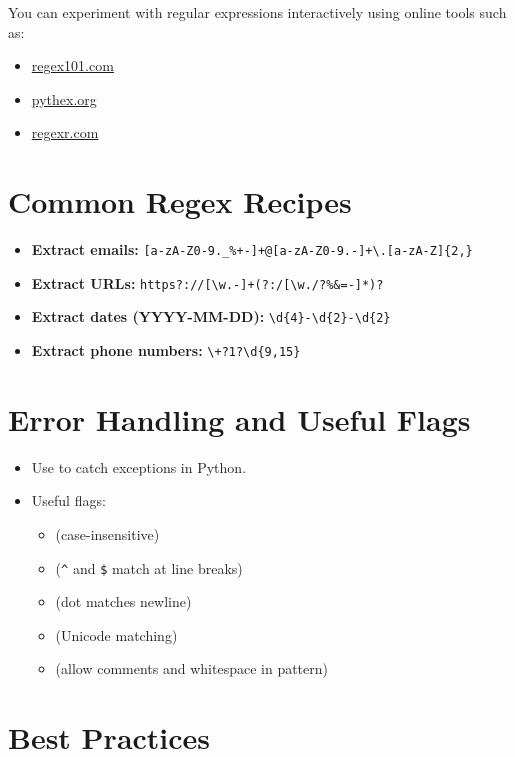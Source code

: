 You can experiment with regular expressions interactively using online tools such as:
\begin{itemize}
    \item \href{https://regex101.com/}{regex101.com}
    \item \href{https://pythex.org/}{pythex.org}
    \item \href{https://regexr.com/}{regexr.com}
\end{itemize}

\section{Common Regex Recipes}

\begin{itemize}
    \item \textbf{Extract emails:} \verb|[a-zA-Z0-9._%+-]+@[a-zA-Z0-9.-]+\.[a-zA-Z]{2,}|
    \item \textbf{Extract URLs:} \verb|https?://[\w.-]+(?:/[\w./?%&=-]*)?|
    \item \textbf{Extract dates (YYYY-MM-DD):} \verb|\d{4}-\d{2}-\d{2}|
    \item \textbf{Extract phone numbers:} \verb|\+?1?\d{9,15}|
\end{itemize}

\section{Error Handling and Useful Flags}

\begin{itemize}
    \item Use  to catch  exceptions in Python.
    \item Useful flags:
    \begin{itemize}
        \item {} (case-insensitive)
        \item {} (\verb|^| and \verb|$| match at line breaks)
        \item {} (dot matches newline)
        \item {} (Unicode matching)
        \item {} (allow comments and whitespace in pattern)
    \end{itemize}
\end{itemize}

\section{Best Practices}

